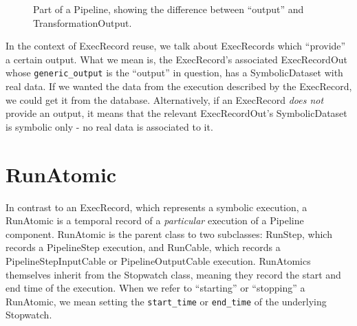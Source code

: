 \documentclass[12pt]{article}
\newcommand{\code}[1]{\texttt{#1}}
\begin{document}
\begin{figure}[ht]
  \centering
  \caption{Part of a Pipeline, showing the difference between ``output'' and TransformationOutput.}
\end{figure}

In the context of ExecRecord reuse, we talk about ExecRecords which ``provide''
a certain output. What we mean is, the ExecRecord's associated ExecRecordOut
whose \code{generic\_output} is the ``output'' in question, has a
SymbolicDataset with real data. If we wanted the data from the execution
described by the ExecRecord, we could get it from the database. Alternatively,
if an ExecRecord \emph{does not} provide an output, it means that the relevant
ExecRecordOut's SymbolicDataset is symbolic only - no real data is associated
to it.

\section*{RunAtomic}

In contrast to an ExecRecord, which represents a symbolic execution, a
RunAtomic is a temporal record of a \emph{particular} execution of a Pipeline
component. RunAtomic is the parent class to two subclasses: RunStep, which
records a PipelineStep execution, and RunCable, which records a
PipelineStepInputCable or PipelineOutputCable execution. RunAtomics themselves
inherit from the Stopwatch class, meaning they record the start and end time of
the execution. When we refer to ``starting'' or ``stopping'' a RunAtomic, we
mean setting the \code{start\_time} or \code{end\_time} of the underlying
Stopwatch.
\end{document}
